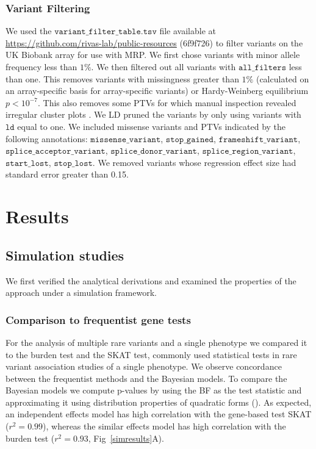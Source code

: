 \subsubsection*{Variant Filtering}
We used the $\texttt{variant\_filter\_table.tsv}$ file available at \url{https://github.com/rivas-lab/public-resources} (6f9f726) to filter variants on the UK Biobank array for use with MRP. We first chose variants with minor allele frequency less than $1\%$. We then filtered out all variants with $\texttt{all\_filters}$ less than one. This removes variants with missingness greater than $1\%$ (calculated on an array-specific basis for array-specific variants) or Hardy-Weinberg equilibrium $p < 10^{-7}$. This also removes some PTVs for which manual inspection revealed irregular cluster plots \cite{DeBoever179762}. We LD pruned the variants by only using variants with $\texttt{ld}$ equal to one. We included missense variants and PTVs indicated by the following annotations: $\texttt{missense\_variant}$, 
$\texttt{stop\_gained}$, $\texttt{frameshift\_variant}$, $\texttt{splice\_acceptor\_variant}$, $\texttt{splice\_donor\_variant}$, $\texttt{splice\_region\_variant}$, $\texttt{start\_lost}$, $\texttt{stop\_lost}$. We removed variants whose regression effect size had standard error greater than 0.15.

\section*{Results}

\subsection*{Simulation studies}
We first verified the analytical derivations and examined the properties of the approach under a simulation framework. 

\subsubsection*{Comparison to frequentist gene tests}
For the analysis of multiple rare variants and a single phenotype we compared it to the burden test and the SKAT test, commonly used statistical tests in rare variant association studies of a single phenotype. We observe concordance between the frequentist methods and the Bayesian models. To compare the Bayesian models we compute p-values by using the BF as the test statistic and approximating it using distribution properties of quadratic forms (). As expected, an independent effects model has high correlation with the gene-based test SKAT ($r^2 = 0.99$), whereas the similar effects model has high correlation with the burden test ($r^2 = 0.93$, Fig~\ref{simresults}A). 

